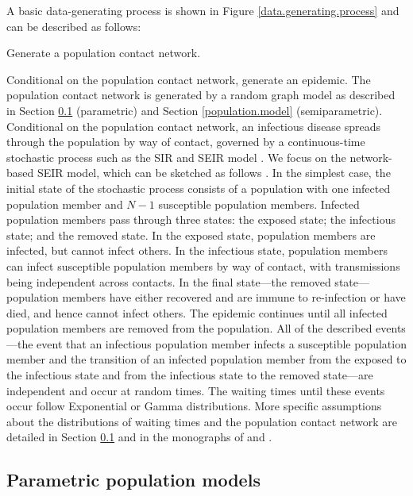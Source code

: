 \documentclass[12pt,usenatbib,referee]{article}
\begin{document}
A basic data-generating process is shown in Figure \ref{data.generating.process} and can be described as follows:
\bi
\item Generate a population contact network.
\item Conditional on the population contact network, 
generate an epidemic.
\ei
The population contact network is generated by a random graph model as described in Section \ref{likelihood.function} (parametric) and Section \ref{population.model} (semiparametric).
Conditional on the population contact network,
an infectious disease spreads through the population by way of contact,
governed by a continuous-time stochastic process such as the SIR and SEIR model \citep{AnBr00,BrNe02,GrWeHu10,GrWeHu11}.
We focus on the network-based SEIR model,
which can be sketched as follows \citep{BrNe02,GrWeHu10,GrWeHu11}.
In the simplest case,
the initial state of the stochastic process consists of a population with one infected population member and $N - 1$ susceptible population members.
Infected population members pass through three states:
the exposed state;
the infectious state;
and the removed state.
In the exposed state,
population members are infected, but cannot infect others.
In the infectious state, 
population members can infect susceptible population members by way of contact,
with transmissions being independent across contacts.
In the final state---the removed state---population members have either recovered and are immune to re-infection or have died,
and hence cannot infect others.
The epidemic continues until all infected population members are removed from the population.
All of the described events---the event that an infectious population member infects a susceptible population member and the transition of an infected population member from the exposed to the infectious state and from the infectious state to the removed state---are independent and occur at random times.
The waiting times until these events occur follow Exponential or Gamma distributions.
More specific assumptions about the distributions of waiting times and the population contact network are detailed in Section \ref{likelihood.function} and in the monographs of \citet{AnBr00} and \citet{epibook}.

\subsection{Parametric population models}
\label{likelihood.function}
\end{document}
